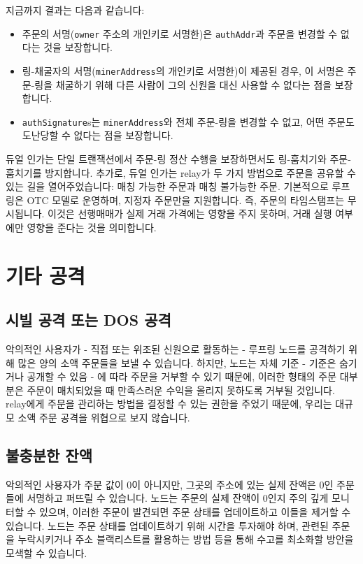 \documentclass[UTF8,nofonts]{article}
\begin{document}
\begin{multicols}{2}
\begin{enumerate}
\end{enumerate}

지금까지 결과는 다음과 같습니다:

\begin{itemize}

	\item  주문의 서명(\verb|owner| 주소의 개인키로 서명한)은 \verb|authAddr|과 주문을 변경할 수 없다는 것을 보장합니다.
	\item  링-채굴자의 서명(\verb|minerAddress|의 개인키로 서명한)이 제공된 경우, 이 서명은 주문-링을 채굴하기 위해 다른 사람이 그의 신원을 대신 사용할 수 없다는 점을 보장합니다. 
	\item  \verb|authSignature|s는 \verb|minerAddress|와 전체 주문-링을 변경할 수 없고, 어떤 주문도 도난당할 수 없다는 점을 보장합니다. 

\end{itemize}

듀얼 인가는 단일 트랜잭션에서 주문-링 정산 수행을 보장하면서도 링-훔치기와 주문-훔치기를 방지합니다. 추가로, 듀얼 인가는 relay가 두 가지 방법으로 주문을 공유할 수 있는 길을 열어주었습니다: 매칭 가능한 주문과 매칭 불가능한 주문. 기본적으로 루프링은 OTC 모델로 운영하며, 지정자 주문만을 지원합니다. 즉, 주문의 타임스탬프는 무시됩니다. 이것은 선행매매가 실제 거래 가격에는 영향을 주지 못하며, 거래 실행 여부에만 영향을 준다는 것을 의미합니다.

\section{기타 공격}

\subsection{시빌 공격 또는 DOS 공격}
악의적인 사용자가 - 직접 또는 위조된 신원으로 활동하는 - 루프링 노드를 공격하기 위해 많은 양의 소액 주문들을 보낼 수 있습니다. 하지만, 노드는 자체 기준 - 기준은 숨기거나 공개할 수 있음 - 에 따라 주문을 거부할 수 있기 때문에, 이러한 형태의 주문 대부분은 주문이 매치되었을 때 만족스러운 수익을 올리지 못하도록 거부될 것입니다. relay에게 주문을 관리하는 방법을 결정할 수 있는 권한을 주었기 때문에, 우리는 대규모 소액 주문 공격을 위협으로 보지 않습니다.    

\subsection{불충분한 잔액}
악의적인 사용자가 주문 값이 0이 아니지만, 그곳의 주소에 있는 실제 잔액은 0인 주문들에 서명하고 퍼뜨릴 수 있습니다. 노드는 주문의 실제 잔액이 0인지 주의 깊게 모니터할 수 있으며, 이러한 주문이 발견되면 주문 상태를 업데이트하고 이들을 제거할 수 있습니다.
노드는 주문 상태를 업데이트하기 위해 시간을 투자해야 하며, 관련된 주문을 누락시키거나 주소 블랙리스트를 활용하는 방법 등을 통해 수고를 최소화할 방안을 모색할 수 있습니다.



\end{multicols}
\end{document}
